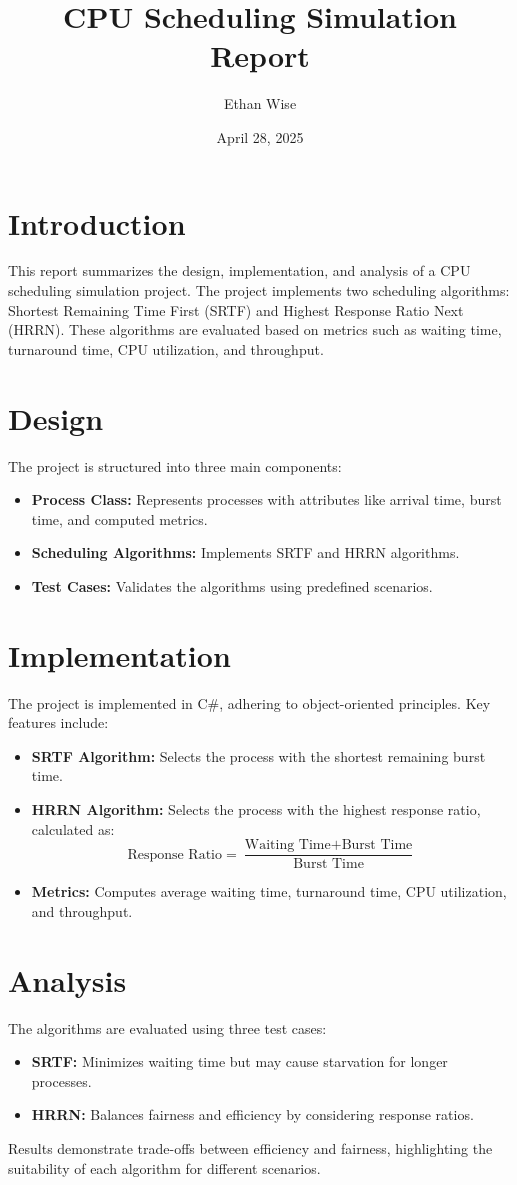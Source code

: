 \documentclass[12pt]{article}
\title{CPU Scheduling Simulation Report}
\author{Ethan Wise}
\date{April 28, 2025}
\begin{document}
\maketitle

\section*{Introduction}
This report summarizes the design, implementation, and analysis of a CPU scheduling simulation project. The project implements two scheduling algorithms: Shortest Remaining Time First (SRTF) and Highest Response Ratio Next (HRRN). These algorithms are evaluated based on metrics such as waiting time, turnaround time, CPU utilization, and throughput.

\section*{Design}
The project is structured into three main components:
\begin{itemize}
    \item \textbf{Process Class:} Represents processes with attributes like arrival time, burst time, and computed metrics.
    \item \textbf{Scheduling Algorithms:} Implements SRTF and HRRN algorithms.
    \item \textbf{Test Cases:} Validates the algorithms using predefined scenarios.
\end{itemize}

\section*{Implementation}
The project is implemented in C\#, adhering to object-oriented principles. Key features include:
\begin{itemize}
    \item \textbf{SRTF Algorithm:} Selects the process with the shortest remaining burst time.
    \item \textbf{HRRN Algorithm:} Selects the process with the highest response ratio, calculated as:
    \[ \text{Response Ratio} = \frac{\text{Waiting Time} + \text{Burst Time}}{\text{Burst Time}} \]
    \item \textbf{Metrics:} Computes average waiting time, turnaround time, CPU utilization, and throughput.
\end{itemize}

\section*{Analysis}
The algorithms are evaluated using three test cases:
\begin{itemize}
    \item \textbf{SRTF:} Minimizes waiting time but may cause starvation for longer processes.
    \item \textbf{HRRN:} Balances fairness and efficiency by considering response ratios.
\end{itemize}
Results demonstrate trade-offs between efficiency and fairness, highlighting the suitability of each algorithm for different scenarios.
\end{document}
